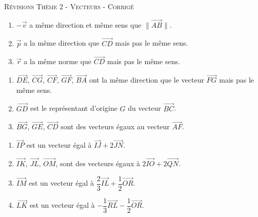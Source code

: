 \documentclass[a4paper]{article}
\begin{document}
    \pagebreak


\begin{center}
    {\scshape\LARGE Révisions Thème 2 - Vecteurs - Corrigé\par}
    \vspace{0.5cm}
  \end{center}

  \setcounter{exercice}{0}

  \begin{exercice}{}{}

    \begin{enumerate}
      \item $-\overrightarrow{v}$ a même direction et même sens que $\lVert \overrightarrow{AB} \rVert$.
      \item $\overrightarrow{p}$ a la même direction que $\overrightarrow{CD}$ mais pas le même sens.
      \item $\overrightarrow{r}$ a la même norme que $\overrightarrow{CD}$ mais pas le même sens.
    \end{enumerate}
    \end{exercice}
    
\medskip
    \begin{exercice}{}{}
    
      \begin{enumerate}
        \item $\overrightarrow{DE}$, $\overrightarrow{CG}$, $\overrightarrow{CF}$, $\overrightarrow{GF}$, $\overrightarrow{BA}$ 
        ont la même direction que le vecteur $\overrightarrow{FG}$ mais pas le même sens.
        \item $\overrightarrow{GD}$  est le représentant d'origine $G$ du vecteur $\overrightarrow{BC}$.
        \item $\overrightarrow{BG}$, $\overrightarrow{GE}$, $\overrightarrow{CD}$ sont des vecteurs égaux au vecteur $\overrightarrow{AF}$.
      \end{enumerate}
    
    \end{exercice}
    \medskip
    
    
    \begin{exercice}{}{}
          \begin{enumerate}
            \item $\overrightarrow{IP}$ est un vecteur égal à $\overrightarrow{IJ}+2\overrightarrow{JN}$.
            \item $\overrightarrow{IK}$, $\overrightarrow{JL}$, $\overrightarrow{OM}$, sont des vecteurs égaux à $2\overrightarrow{IO}+2\overrightarrow{QN}$.
            \item $\overrightarrow{IM}$ est un vecteur égal à $\dfrac{2}{3}\overrightarrow{IL}+\dfrac{1}{2}\overrightarrow{OR}$.
            \item $\overrightarrow{LK}$ est un vecteur égal à $-\dfrac{1}{3}\overrightarrow{RL}-\dfrac{1}{2}\overrightarrow{OR}$.
          \end{enumerate}
    \end{exercice}
    
\end{document}

